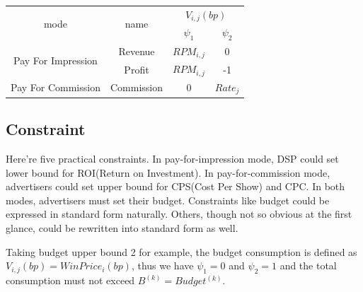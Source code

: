 \documentclass[sigconf]{acmart}
\newcommand{\sV}{V_{i,j}}
\newcommand{\sB}{B^{(k)}}
\newcommand{\sRPM}{RPM_{i,j}}
\newcommand{\pprob}{\psi_1}
\newcommand{\pprice}{\psi_2}
\begin{document}
\begin{center}
\begin{tabular}{|c|c|c|c|}
\hline
\multirow{2}{*}{mode}               & \multirow{2}{*}{name}       & \multicolumn{2}{c|}{$\sV(bp)$} \\
\cline{3-4}
                                    &                             & $\pprob$       & $\pprice$ \\
\hline
\multirow{2}{*}{Pay For Impression} & Revenue                     & $\sRPM$    & 0 \\
\cline{2-4}
                                    & Profit                      & $\sRPM$    & -1 \\
\hline
\multirow{1}{*}{Pay For Commission} & Commission                  & 0              &$Rate_j$ \\
\hline
\end{tabular}
\end{center}

\subsection{Constraint}

Here're five practical constraints.
In pay-for-impression mode, DSP could set lower bound for ROI(Return on Investment).
In pay-for-commission mode, advertisers could set upper bound for CPS(Cost Per Show) and CPC.
In both modes, advertisers must set their budget.
Constraints like budget could be expressed in standard form naturally.
Others, though not so obvious at the first glance, could be rewritten into standard form as well.

Taking budget upper bound 2 for example, the budget consumption is defined as $\sV(bp)=WinPrice_i(bp)$,
    thus we have $\pprob=0$ and $\pprice=1$ and the total consumption must not exceed $\sB=Budget^{(k)}$.
\end{document}
